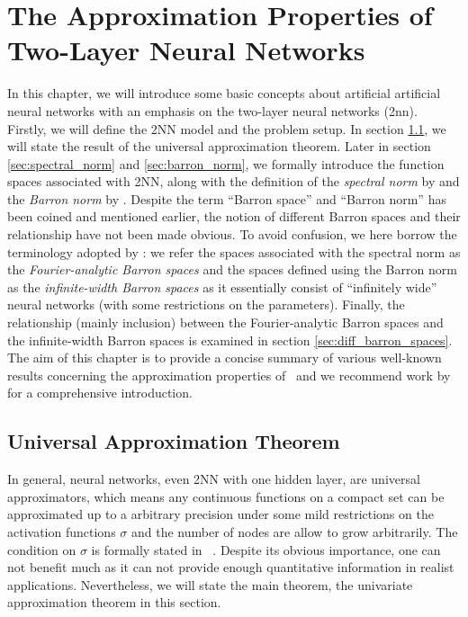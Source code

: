 \chapter{The Approximation Properties of Two-Layer Neural Networks}

In this chapter, we will introduce some basic concepts about artificial
artificial neural networks with an emphasis on the two-layer neural networks
(\gls{2nn}). Firstly, we will define the 2NN model and the problem setup. In
section \ref{sec:uat}, we will state the result of the universal approximation
theorem. Later in section \ref{sec:spectral_norm} and \ref{sec:barron_norm}, we
formally introduce the function spaces associated with 2NN, along with the
definition of the \textit{spectral norm} by
\cite{barronUniversalApproximationBounds1993} and the \textit{Barron norm} by
\cite{eBarronSpaceFlowinduced2021}. Despite the term ``Barron space'' and
``Barron norm'' has been coined and mentioned earlier, the notion of different
Barron spaces and their relationship have not been made obvious. To avoid
confusion, we here borrow the terminology adopted by
\cite{carageaNeuralNetworkApproximation2022}: we refer the spaces associated
with the spectral norm as the \textit{Fourier-analytic Barron spaces} and the
spaces defined using the Barron norm as the \textit{infinite-width Barron
spaces} as it essentially consist of ``infinitely wide'' neural networks (with
some restrictions on the parameters). Finally, the relationship (mainly
inclusion) between the Fourier-analytic Barron spaces and the infinite-width
Barron spaces is examined in section \ref{sec:diff_barron_spaces}. The aim of
this chapter is to provide a concise summary of various well-known results
concerning the approximation properties of \ and we recommend work by
\cite{eMathematicalUnderstandingNeural2020,bernerModernMathematicsDeep2021} for
a comprehensive introduction.






\section{Universal Approximation Theorem}
\label{sec:uat}

In general, neural networks, even 2NN with one hidden layer, are universal
approximators, which means any continuous functions on a compact set can be
approximated up to a arbitrary precision under some mild restrictions on the
activation functions $\sigma$ and the number of nodes are allow to grow
arbitrarily. The condition on $\sigma$ is formally stated in
~\cite{cybenkoApproximationSuperpositionsSigmoidal1989}. Despite its obvious
importance, one can not benefit much as it can not provide enough quantitative
information in realist applications. Nevertheless, we will state the main theorem, the univariate approximation theorem in this section.

